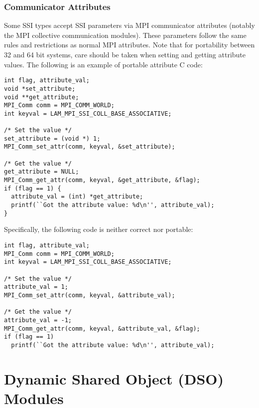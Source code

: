 
\subsubsection{Communicator Attributes}

Some SSI types accept SSI parameters via MPI communicator attributes
(notably the MPI collective communication modules).  These parameters
follow the same rules and restrictions as normal MPI attributes.  Note
that for portability between 32 and 64 bit systems, care should be
taken when setting and getting attribute values.  The following is an
example of portable attribute C code:

\lstset{style=lam-c}
\begin{lstlisting}
int flag, attribute_val;
void *set_attribute;
void **get_attribute;
MPI_Comm comm = MPI_COMM_WORLD;
int keyval = LAM_MPI_SSI_COLL_BASE_ASSOCIATIVE;

/* Set the value */
set_attribute = (void *) 1;
MPI_Comm_set_attr(comm, keyval, &set_attribute);

/* Get the value */
get_attribute = NULL;
MPI_Comm_get_attr(comm, keyval, &get_attribute, &flag);
if (flag == 1) {
  attribute_val = (int) *get_attribute;
  printf(``Got the attribute value: %d\n'', attribute_val);
}
\end{lstlisting}

Specifically, the following code is neither correct nor portable:

\lstset{style=lam-c}
\begin{lstlisting}
int flag, attribute_val;
MPI_Comm comm = MPI_COMM_WORLD;
int keyval = LAM_MPI_SSI_COLL_BASE_ASSOCIATIVE;

/* Set the value */
attribute_val = 1;
MPI_Comm_set_attr(comm, keyval, &attribute_val);

/* Get the value */
attribute_val = -1;
MPI_Comm_get_attr(comm, keyval, &attribute_val, &flag);
if (flag == 1)
  printf(``Got the attribute value: %d\n'', attribute_val);
\end{lstlisting}



\section{Dynamic Shared Object (DSO) Modules}

